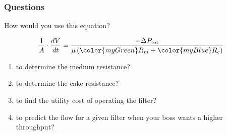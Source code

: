 \begin{frame}\frametitle{Questions}
	How would you use this equation?
	\begin{exampleblock}{}
		\[\dfrac{1}{A} \cdot \dfrac{dV}{dt} = \dfrac{-\Delta P_\text{tot}}{\mu \left({\color{myGreen}R_m} + {\color{myBlue}R_c} \right)}\]
	\end{exampleblock}
	
	\begin{enumerate}
		\item	to determine the medium resistance?
		\item	to determine the cake resistance?
		\item	to find the utility cost of operating the filter?
		\item	to predict the flow for a given filter when your boss wants a higher throughput?
	\end{enumerate}
\end{frame}
